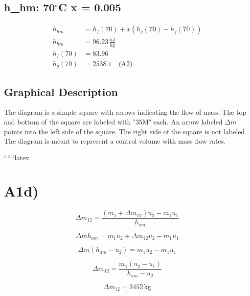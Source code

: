 \subsection*{h_{hm}: 70$^\circ$C x = 0.005}

\begin{align*}
h_{hm} &= h_f (70) + x \left( h_g (70) - h_f (70) \right) \\
h_{hm} &= 96.23 \, \frac{\text{kJ}}{\text{kg}} \\
h_f (70) &= 83.96 \\
h_g (70) &= 2538.1 \quad \text{(A2)}
\end{align*}

\subsection*{Graphical Description}

The diagram is a simple square with arrows indicating the flow of mass. The top and bottom of the square are labeled with "35M" each. An arrow labeled $\Delta \dot{m}$ points into the left side of the square. The right side of the square is not labeled. The diagram is meant to represent a control volume with mass flow rates.

``````latex

\section*{A1d)}

\[
\Delta m_{12} = \frac{(m_1 + \Delta m_{12}) u_2 - m_1 u_1}{h_{am}}
\]

\[
\Delta m h_{am} = m_1 u_2 + \Delta m_{12} u_2 - m_1 u_1
\]

\[
\Delta m (h_{am} - u_2) = m_1 u_2 - m_1 u_1
\]

\[
\Delta m_{12} = \frac{m_1 (u_2 - u_1)}{h_{am} - u_2}
\]

\[
\underline{\Delta m_{12} = 3452 \, \text{kg}}
\]